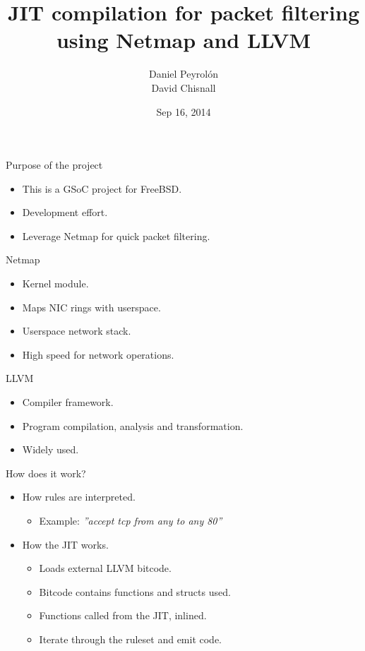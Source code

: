 \documentclass{beamer}
\title{JIT compilation for packet filtering using Netmap and LLVM}
\author[Peyrol\'on \and Chisnall]{Daniel Peyrol\'on \\ David Chisnall}
\date{Sep 16, 2014}
\begin{document}
\begin{frame}
  \titlepage
\end{frame}

\begin{frame}{Purpose of the project}
	\begin{itemize}
		\item \Large{This is a GSoC project for FreeBSD.}
		\item Development effort.
		\item Leverage Netmap for quick packet filtering.
	\end{itemize}
\end{frame}

\begin{frame}{Netmap}{}
	\begin{block}{}
		\begin{itemize}
			\item \Large{Kernel module.}
			\item Maps NIC rings with userspace.
			\item Userspace network stack.
			\item High speed for network operations.
		\end{itemize}
	\end{block}
\end{frame}

\begin{frame}{LLVM}{}
	\begin{block}{}
		\begin{itemize}
			\item \Large{Compiler framework.}
			\item Program compilation, analysis and transformation.
			\item Widely used.
		\end{itemize}
	\end{block}
\end{frame}

\begin{frame}{How does it work?}
	\begin{itemize}

		\item \Large{How rules are interpreted.}
		\begin{itemize}
			\item \Large{Example: \textit{''accept tcp from any to any 80''}}
		\end{itemize}

		\item How the JIT works.
		\begin{itemize}
			\item \Large{Loads external LLVM bitcode.}
			\item Bitcode contains functions and structs used.
			\item Functions called from the JIT, inlined.
			\item Iterate through the ruleset and emit code.
		\end{itemize}

	\end{itemize}
\end{frame}
\end{document}
